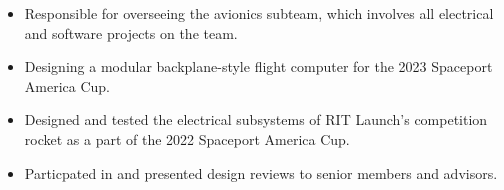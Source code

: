 \documentclass[]{deedy-resume-openfont}
\begin{document}
\begin{minipage}[t]{0.66\textwidth}
\begin{itemize}
    \item Responsible for overseeing the avionics subteam, which involves all electrical and software projects on the team.
    \item Designing a modular backplane-style flight computer for the 2023 Spaceport America Cup.
\end{itemize}
\begin{itemize}
    \setlength\itemsep{0pt}
    \item Designed and tested the electrical subsystems of RIT Launch's competition rocket as a part of the 2022 Spaceport America Cup.
    \item Particpated in and presented design reviews to senior members and advisors.
\end{itemize}






 

\sectionsep

\end{minipage} 
\end{document}
